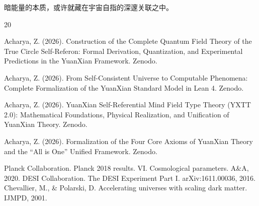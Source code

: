 \documentclass[12pt,a4paper]{ctexart}
\begin{document}
暗能量的本质，或许就藏在宇宙自指的深邃关联之中。

\begin{thebibliography}{20}

Acharya, Z. (2026). Construction of the Complete Quantum Field Theory of the True Circle Self-Referon: Formal Derivation, Quantization, and Experimental Predictions in the YuanXian Framework. Zenodo. 

Acharya, Z. (2026). From Self-Consistent Universe to Computable Phenomena: Complete Formalization of the YuanXian Standard Model in Lean 4. Zenodo. 

Acharya, Z. (2026). YuanXian Self-Referential Mind Field Type Theory (YXTT 2.0): Mathematical Foundations, Physical Realization, and Unification of YuanXian Theory. Zenodo. 

Acharya, Z. (2026). Formalization of the Four Core Axioms of YuanXian Theory and the ``All is One'' Unified Framework. Zenodo. 

 Planck Collaboration. Planck 2018 results. VI. Cosmological parameters. A\&A, 2020.
 DESI Collaboration. The DESI Experiment Part I. arXiv:1611.00036, 2016.
 Chevallier, M., \& Polarski, D. Accelerating universes with scaling dark matter. IJMPD, 2001.

\end{thebibliography}
\end{document}
